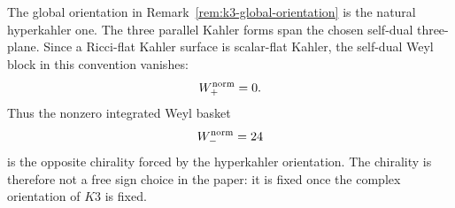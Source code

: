 
\makeatletter
{}
\makeatother
\providecommand{\PSp}{\mathrm{PSp}}
\providecommand{\Aut}{\mathrm{Aut}}
\providecommand{\spec}{\operatorname{spec}}


\begin{remark}
\label{rem:k3-hyperkahler-weyl-chirality}
The global orientation in Remark~\ref{rem:k3-global-orientation} is the natural
hyperkahler one.  The three parallel Kahler forms span the chosen self-dual
three-plane.  Since a Ricci-flat Kahler surface is scalar-flat Kahler, the
self-dual Weyl block in this convention vanishes:
\[
  W_+^{\rm norm}=0.
\]
Thus the nonzero integrated Weyl basket
\[
  W_-^{\rm norm}=24
\]
is the opposite chirality forced by the hyperkahler orientation.  The chirality
is therefore not a free sign choice in the paper: it is fixed once the complex
orientation of $K3$ is fixed.
\end{remark}
